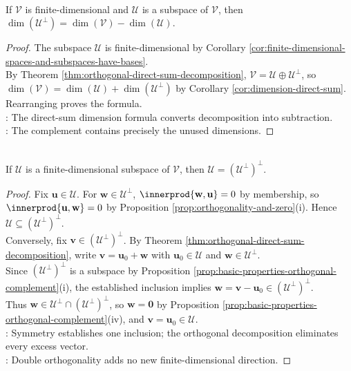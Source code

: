 \begin{corollary} \label{cor:dimension-of-orthogonal-complement} \\
If $\mathcal{V}$ is finite-dimensional and $\mathcal{U}$ is a subspace of $\mathcal{V}$, then $\dim(\mathcal{U}^{\perp})=\dim(\mathcal{V})-\dim(\mathcal{U})$.
\begin{proof}
The subspace $\mathcal{U}$ is finite-dimensional by Corollary \ref{cor:finite-dimensional-spaces-and-subspaces-have-bases}.\\
By Theorem \ref{thm:orthogonal-direct-sum-decomposition}, $\mathcal{V}=\mathcal{U}\oplus\mathcal{U}^{\perp}$, so $\dim(\mathcal{V})=\dim(\mathcal{U})+\dim(\mathcal{U}^{\perp})$ by Corollary \ref{cor:dimension-direct-sum}. Rearranging proves the formula.\\
: The direct-sum dimension formula converts decomposition into subtraction.\\
: The complement contains precisely the unused dimensions.
\end{proof}
\end{corollary}

\begin{corollary} \label{cor:double-orthogonal-complement} \\
If $\mathcal{U}$ is a finite-dimensional subspace of $\mathcal{V}$, then $\mathcal{U}=(\mathcal{U}^{\perp})^{\perp}$.
\begin{proof}
Fix $\mathbf{u}\in\mathcal{U}$. For $\mathbf{w}\in\mathcal{U}^{\perp}$, $\innerprod{\mathbf{w},\mathbf{u}}=0$ by membership, so $\innerprod{\mathbf{u},\mathbf{w}}=0$ by Proposition \ref{prop:orthogonality-and-zero}(i). Hence $\mathcal{U}\subseteq(\mathcal{U}^{\perp})^{\perp}$.\\
Conversely, fix $\mathbf{v}\in(\mathcal{U}^{\perp})^{\perp}$. By Theorem \ref{thm:orthogonal-direct-sum-decomposition}, write $\mathbf{v}=\mathbf{u}_0+\mathbf{w}$ with $\mathbf{u}_0\in\mathcal{U}$ and $\mathbf{w}\in\mathcal{U}^{\perp}$.\\
Since $(\mathcal{U}^{\perp})^{\perp}$ is a subspace by Proposition \ref{prop:basic-properties-orthogonal-complement}(i), the established inclusion implies $\mathbf{w}=\mathbf{v}-\mathbf{u}_0\in(\mathcal{U}^{\perp})^{\perp}$.\\
Thus $\mathbf{w}\in\mathcal{U}^{\perp}\cap(\mathcal{U}^{\perp})^{\perp}$, so $\mathbf{w}=\mathbf{0}$ by Proposition \ref{prop:basic-properties-orthogonal-complement}(iv), and $\mathbf{v}=\mathbf{u}_0\in\mathcal{U}$.\\
: Symmetry establishes one inclusion; the orthogonal decomposition eliminates every excess vector.\\
: Double orthogonality adds no new finite-dimensional direction.
\end{proof}
\end{corollary}

